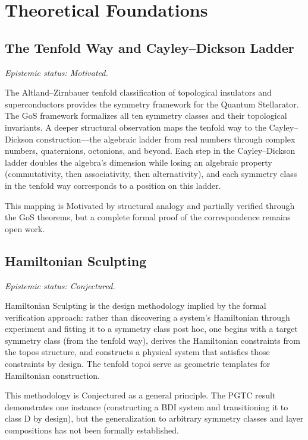 \documentclass[12pt,letterpaper]{report}
\newcommand{\epistemic}[1]{%
  \par\vspace{4pt}%
  {\small\itshape\color{gray} Epistemic status: #1}%
  \par\vspace{4pt}%
}
\begin{document}

\chapter{Theoretical Foundations}

\section{The Tenfold Way and Cayley--Dickson Ladder}

\epistemic{Motivated.}

The Altland--Zirnbauer tenfold classification of topological insulators and superconductors provides the symmetry framework for the Quantum Stellarator. The GoS framework formalizes all ten symmetry classes and their topological invariants. A deeper structural observation maps the tenfold way to the Cayley--Dickson construction---the algebraic ladder from real numbers through complex numbers, quaternions, octonions, and beyond. Each step in the Cayley--Dickson ladder doubles the algebra's dimension while losing an algebraic property (commutativity, then associativity, then alternativity), and each symmetry class in the tenfold way corresponds to a position on this ladder.

This mapping is Motivated by structural analogy and partially verified through the GoS theorems, but a complete formal proof of the correspondence remains open work.

\section{Hamiltonian Sculpting}

\epistemic{Conjectured.}

Hamiltonian Sculpting is the design methodology implied by the formal verification approach: rather than discovering a system's Hamiltonian through experiment and fitting it to a symmetry class post hoc, one begins with a target symmetry class (from the tenfold way), derives the Hamiltonian constraints from the topos structure, and constructs a physical system that satisfies those constraints by design. The tenfold topoi serve as geometric templates for Hamiltonian construction.

This methodology is Conjectured as a general principle. The PGTC result demonstrates one instance (constructing a BDI system and transitioning it to class D by design), but the generalization to arbitrary symmetry classes and layer compositions has not been formally established.
\end{document}
